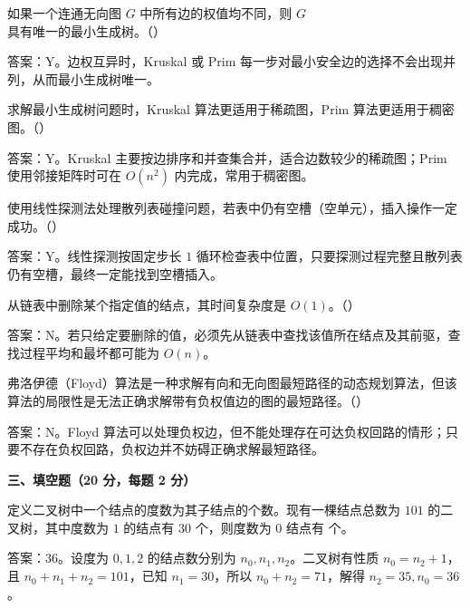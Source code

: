 \begin{question}
如果一个连通无向图 $G$ 中所有边的权值均不同，则 $G$ 具有唯一的最小生成树。（\quad）
\begin{solution}
答案：Y。边权互异时，Kruskal 或 Prim 每一步对最小安全边的选择不会出现并列，从而最小生成树唯一。
\end{solution}
\end{question}

\begin{question}
求解最小生成树问题时，Kruskal 算法更适用于稀疏图，Prim 算法更适用于稠密图。（\quad）
\begin{solution}
答案：Y。Kruskal 主要按边排序和并查集合并，适合边数较少的稀疏图；Prim 使用邻接矩阵时可在 $O(n^2)$ 内完成，常用于稠密图。
\end{solution}
\end{question}

\begin{question}
使用线性探测法处理散列表碰撞问题，若表中仍有空槽（空单元），插入操作一定成功。（\quad）
\begin{solution}
答案：Y。线性探测按固定步长 $1$ 循环检查表中位置，只要探测过程完整且散列表仍有空槽，最终一定能找到空槽插入。
\end{solution}
\end{question}

\begin{question}
从链表中删除某个指定值的结点，其时间复杂度是 $O(1)$。（\quad）
\begin{solution}
答案：N。若只给定要删除的值，必须先从链表中查找该值所在结点及其前驱，查找过程平均和最坏都可能为 $O(n)$。
\end{solution}
\end{question}

\begin{question}
弗洛伊德（Floyd）算法是一种求解有向和无向图最短路径的动态规划算法，但该算法的局限性是无法正确求解带有负权值边的图的最短路径。（\quad）
\begin{solution}
答案：N。Floyd 算法可以处理负权边，但不能处理存在可达负权回路的情形；只要不存在负权回路，负权边并不妨碍正确求解最短路径。
\end{solution}
\end{question}

\textbf{三、填空题（20 分，每题 2 分）}

\begin{question}
定义二叉树中一个结点的度数为其子结点的个数。现有一棵结点总数为 $101$ 的二叉树，其中度数为 $1$ 的结点有 $30$ 个，则度数为 $0$ 结点有 \blank 个。
\begin{solution}
答案：$36$。设度为 $0,1,2$ 的结点数分别为 $n_0,n_1,n_2$。二叉树有性质 $n_0=n_2+1$，且 $n_0+n_1+n_2=101$，已知 $n_1=30$，所以 $n_0+n_2=71$，解得 $n_2=35,n_0=36$。
\end{solution}
\end{question}

